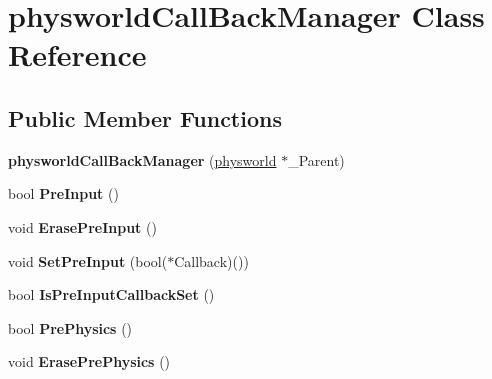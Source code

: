 \hypertarget{classphysworldCallBackManager}{
\section{physworldCallBackManager Class Reference}
\label{d8/d84/classphysworldCallBackManager}
}
\subsection*{Public Member Functions}
\begin{DoxyCompactItemize}
\item 
\hypertarget{classphysworldCallBackManager_a46b7d29b38ecdd7ddf256e9c6688dec9}{
{\bfseries physworldCallBackManager} (\hyperlink{classphysworld}{physworld} $\ast$\_\-Parent)}
\label{d8/d84/classphysworldCallBackManager_a46b7d29b38ecdd7ddf256e9c6688dec9}

\item 
\hypertarget{classphysworldCallBackManager_a76decb95db8cf433cd2cabc57c72d305}{
bool {\bfseries PreInput} ()}
\label{d8/d84/classphysworldCallBackManager_a76decb95db8cf433cd2cabc57c72d305}

\item 
\hypertarget{classphysworldCallBackManager_aacd84b5e9913590357b6692687c19cee}{
void {\bfseries ErasePreInput} ()}
\label{d8/d84/classphysworldCallBackManager_aacd84b5e9913590357b6692687c19cee}

\item 
\hypertarget{classphysworldCallBackManager_a57880b706f02d15e562579433f643046}{
void {\bfseries SetPreInput} (bool($\ast$Callback)())}
\label{d8/d84/classphysworldCallBackManager_a57880b706f02d15e562579433f643046}

\item 
\hypertarget{classphysworldCallBackManager_a9d8b92cf79d6cd4734dd59efa3ea415a}{
bool {\bfseries IsPreInputCallbackSet} ()}
\label{d8/d84/classphysworldCallBackManager_a9d8b92cf79d6cd4734dd59efa3ea415a}

\item 
\hypertarget{classphysworldCallBackManager_a4f88232dcc08334c4e62e499d2c5109f}{
bool {\bfseries PrePhysics} ()}
\label{d8/d84/classphysworldCallBackManager_a4f88232dcc08334c4e62e499d2c5109f}

\item 
\hypertarget{classphysworldCallBackManager_a02ad3cb8b630514600e786aa3fc1bd69}{
void {\bfseries ErasePrePhysics} ()}
\label{d8/d84/classphysworldCallBackManager_a02ad3cb8b630514600e786aa3fc1bd69}


\end{DoxyCompactItemize}
